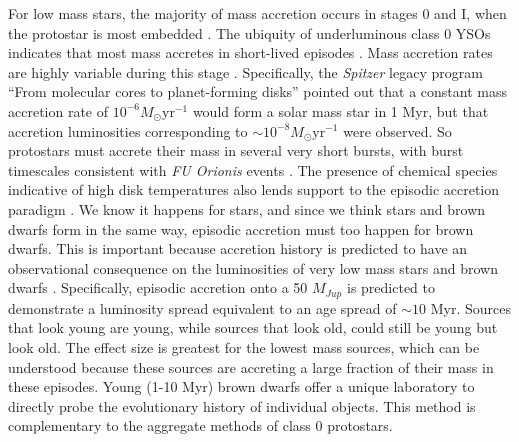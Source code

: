 For low mass stars, the majority of mass accretion occurs in stages 0 and I, when the protostar is most embedded \citep{2007ARA&A..45..565M,2014prpl.conf..195D}.  The ubiquity of underluminous class 0 YSOs indicates that most mass accretes in short-lived episodes \citep{2008ApJS..179..249D}.  Mass accretion rates are highly variable during this stage \citep{2006ApJ...650..956V,2009ApJ...702L..27B,2014prpl.conf..387A}.  Specifically, the \emph{Spitzer} legacy program ``From molecular cores to planet-forming disks'' \citep[][\emph{c2d}]{2009ApJS..181..321E} pointed out that a constant mass accretion rate of $10^{-6} M_{\odot}\mathrm{yr}^{-1}$ would form a solar mass star in 1 Myr, but that accretion luminosities corresponding to $\sim10^{-8} M_{\odot}\mathrm{yr}^{-1}$ were observed.  So protostars must accrete their mass in several very short bursts, with burst timescales consistent with \emph{FU Orionis} events \citep{2014prpl.conf..195D}.  The presence of chemical species indicative of high disk temperatures also lends support to the episodic accretion paradigm \citep{2012ApJ...754L..18V}.  We know it happens for stars, and since we think stars and brown dwarfs form in the same way, episodic accretion must too happen for brown dwarfs.  This is important because accretion history is predicted to have an observational consequence on the luminosities of very low mass stars and brown dwarfs \citep{2009ApJ...702L..27B,2011ApJ...730...32S}.  Specifically, episodic accretion onto a 50 $M_{Jup}$ is predicted to demonstrate a luminosity spread equivalent to an age spread of $\sim10$ Myr.  Sources that look young are young, while sources that look old, could still be young but look old.  The effect size is greatest for the lowest mass sources, which can be understood because these sources are accreting a large fraction of their mass in these episodes.  Young (1-10 Myr) brown dwarfs offer a unique laboratory to directly probe the evolutionary history of individual objects.  This method is complementary to the aggregate methods of class 0 protostars.  


